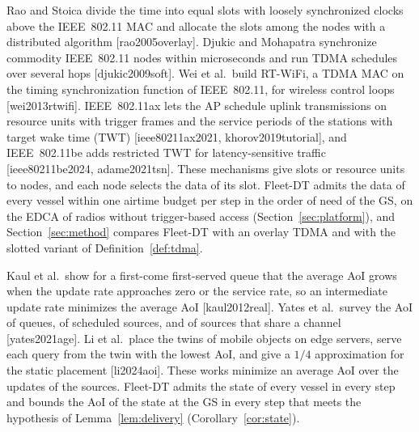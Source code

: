 Rao and Stoica divide the time into equal slots with loosely synchronized clocks above the IEEE~802.11 MAC and allocate the slots among the nodes with a distributed algorithm [rao2005overlay]. Djukic and Mohapatra synchronize commodity IEEE~802.11 nodes within microseconds and run TDMA schedules over several hops [djukic2009soft]. Wei et al.\ build RT-WiFi, a TDMA MAC on the timing synchronization function of IEEE~802.11, for wireless control loops [wei2013rtwifi]. IEEE~802.11ax lets the AP schedule uplink transmissions on resource units with trigger frames and the service periods of the stations with target wake time (TWT) [ieee80211ax2021, khorov2019tutorial], and IEEE~802.11be adds restricted TWT for latency-sensitive traffic [ieee80211be2024, adame2021tsn]. These mechanisms give slots or resource units to nodes, and each node selects the data of its slot. Fleet-DT admits the data of every vessel within one airtime budget per step in the order of need of the GS, on the EDCA of radios without trigger-based access (Section~\ref{sec:platform}), and Section~\ref{sec:method} compares Fleet-DT with an overlay TDMA and with the slotted variant of Definition~\ref{def:tdma}.

Kaul et al.\ show for a first-come first-served queue that the average AoI grows when the update rate approaches zero or the service rate, so an intermediate update rate minimizes the average AoI [kaul2012real]. Yates et al.\ survey the AoI of queues, of scheduled sources, and of sources that share a channel [yates2021age]. Li et al.\ place the twins of mobile objects on edge servers, serve each query from the twin with the lowest AoI, and give a $1/4$ approximation for the static placement [li2024aoi]. These works minimize an average AoI over the updates of the sources. Fleet-DT admits the state of every vessel in every step and bounds the AoI of the state at the GS in every step that meets the hypothesis of Lemma~\ref{lem:delivery} (Corollary~\ref{cor:state}).
